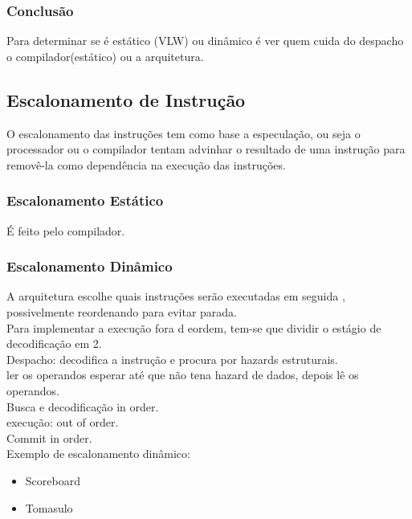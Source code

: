 \documentclass[a4paper]{article}
\begin{document}
\subsubsection{Conclusão}
    Para determinar se é estático (VLW) ou dinâmico é ver quem cuida do despacho o compilador(estático) ou a
    arquitetura.

\subsection{Escalonamento de Instrução}
    O escalonamento das instruções tem como base a especulação, ou seja o processador ou o compilador tentam advinhar o
    resultado de uma instrução para removê-la como dependência na execução das instruções.
\subsubsection{Escalonamento Estático} É feito pelo compilador.
\subsubsection{Escalonamento Dinâmico}
    A arquitetura escolhe quais instruções serão executadas em seguida , possivelmente reordenando para evitar parada.\\
    Para implementar a execução fora d eordem, tem-se que dividir o estágio de decodificação em 2.\\
    Despacho: decodifica a instrução e procura por hazards estruturais.\\
    ler os operandos esperar até que não tena hazard de dados, depois lê os operandos.\\
    Busca e decodificação in order.\\
    execução: out of order.\\
    Commit in order.\\

    Exemplo de escalonamento dinâmico:
    \begin{itemize}
        \item Scoreboard
        \item Tomasulo
    \end{itemize}
\end{document}
